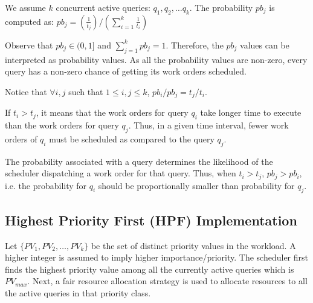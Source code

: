 
We assume $k$ concurrent active queries: $q_{1}, q_{2}, \ldots q_{k}$. 
The probability $pb_{j}$ is computed as:
$pb_{j} = (\frac{1}{t_{j}})/(\sum\limits_{i=1}^{k}\frac{1}{t_{i}})$

Observe that $pb_{j} \in (0, 1]$ and $\sum\limits_{j=1}^{k}pb_{j} = 1$. 
Therefore, the $pb_{j}$ values can be interpreted as probability values. 
As all the probability values are non-zero, every query has a non-zero chance of getting its work orders scheduled. 

Notice that $\forall i, j$ such that $1 \leq i, j \leq k$, 
$pb_{i}/pb_{j} = t_{j}/t_{i}$.

If $t_{i} > t_{j}$, it means that the work orders for query $q_{i}$ take longer time to execute than the work orders for query $q_{j}$. 
Thus, in a given time interval, fewer work orders of $q_{i}$ must be scheduled as compared to the query $q_{j}$. %

The probability associated with a query determines the likelihood of the scheduler dispatching a work order for that query.
Thus, when $t_i > t_j$, $pb_j > pb_i$, i.e.  the probability for $q_{i}$ should be proportionally smaller than probability for $q_{j}$.

\subsection{Highest Priority First (HPF) Implementation}\label{ssec:hpf}
Let $\{PV_{1}, PV_{2}, \ldots, PV_{k}\}$ be the set of distinct priority values in the 
workload. 
A higher integer is assumed to imply higher importance/priority.
The scheduler first finds the highest priority value among all the currently active queries 
which is $PV_{max}$. %
Next, a fair resource allocation strategy is used to allocate resources to all the active queries in that priority class. 

